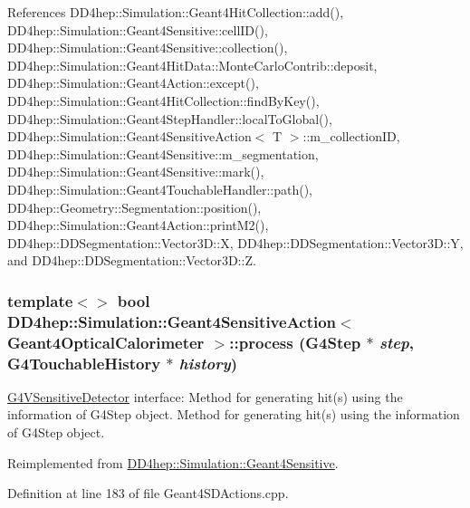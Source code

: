 References DD4hep::Simulation::Geant4HitCollection::add(), DD4hep::Simulation::Geant4Sensitive::cellID(), DD4hep::Simulation::Geant4Sensitive::collection(), DD4hep::Simulation::Geant4HitData::MonteCarloContrib::deposit, DD4hep::Simulation::Geant4Action::except(), DD4hep::Simulation::Geant4HitCollection::findByKey(), DD4hep::Simulation::Geant4StepHandler::localToGlobal(), DD4hep::Simulation::Geant4SensitiveAction$<$ T $>$::m\_\-collectionID, DD4hep::Simulation::Geant4Sensitive::m\_\-segmentation, DD4hep::Simulation::Geant4Sensitive::mark(), DD4hep::Simulation::Geant4TouchableHandler::path(), DD4hep::Geometry::Segmentation::position(), DD4hep::Simulation::Geant4Action::printM2(), DD4hep::DDSegmentation::Vector3D::X, DD4hep::DDSegmentation::Vector3D::Y, and DD4hep::DDSegmentation::Vector3D::Z.\hypertarget{class_d_d4hep_1_1_simulation_1_1_geant4_sensitive_action_a085a617b35c067ca4b29ba4093d976d6}{
\subsubsection[{process}]{\setlength{\rightskip}{0pt plus 5cm}template$<$$>$ bool {\bf DD4hep::Simulation::Geant4SensitiveAction}$<$ {\bf Geant4OpticalCalorimeter} $>$::process (G4Step $\ast$ {\em step}, \/  G4TouchableHistory $\ast$ {\em history})}}
\label{class_d_d4hep_1_1_simulation_1_1_geant4_sensitive_action_a085a617b35c067ca4b29ba4093d976d6}


\hyperlink{class_g4_v_sensitive_detector}{G4VSensitiveDetector} interface: Method for generating hit(s) using the information of G4Step object. Method for generating hit(s) using the information of G4Step object. 

Reimplemented from \hyperlink{class_d_d4hep_1_1_simulation_1_1_geant4_sensitive_a9a9463a6c29a66dad43a52ffc9f7838d}{DD4hep::Simulation::Geant4Sensitive}.

Definition at line 183 of file Geant4SDActions.cpp.

